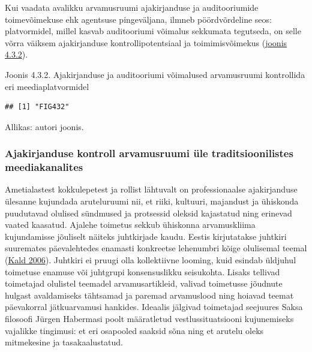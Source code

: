 \documentclass[estonian,]{article}
\begin{document}
Kui vaadata avalikku arvamusruumi ajakirjanduse ja auditooriumide toimevõimekuse ehk agentsuse pingeväljana, ilmneb pöördvõrdeline seos: platvormidel, millel kasvab auditooriumi võimalus sekkumata tegutseda, on selle võrra väiksem ajakirjanduse kontrollipotentsiaal ja toimimisvõimekus (\protect\hyperlink{figure432}{joonis 4.3.2}).

{Joonis 4.3.2.} Ajakirjanduse ja auditooriumi võimalused arvamusruumi kontrollida eri meediaplatvormidel

\begin{verbatim}
## [1] "FIG432"
\end{verbatim}

\begin{imgsource}
{Allikas:} autori joonis.
\end{imgsource}

\hypertarget{ajakirjanduse-kontroll-arvamusruumi-uxfcle-traditsioonilistes-meediakanalites}{%
\subsubsection*{Ajakirjanduse kontroll arvamusruumi üle traditsioonilistes meediakanalites}\label{ajakirjanduse-kontroll-arvamusruumi-uxfcle-traditsioonilistes-meediakanalites}}

Ametialastest kokkulepetest ja rollist lähtuvalt on professionaalse ajakirjanduse ülesanne kujundada aruteluruumi nii, et riiki, kultuuri, majandust ja ühiskonda puudutavad olulised sündmused ja protsessid oleksid kajastatud ning erinevad vaated kaasatud.
Ajalehe toimetus sekkub ühiskonna arvamuskliima kujundamisse jõuliselt näiteks juhtkirjade kaudu. Eestis kirjutatakse juhtkiri suuremates päevalehtedes enamasti konkreetse lehenumbri kõige olulisemal teemal (\protect\hyperlink{Kald2006}{Kald 2006}). Juhtkiri ei pruugi olla kollektiivne looming, kuid esindab üldjuhul toimetuse enamuse või juhtgrupi konsensuslikku seisukohta. Lisaks tellivad toimetajad olulistel teemadel arvamusartikleid, valivad toimetusse jõudnute hulgast avaldamiseks tähtsamad ja paremad arvamuslood ning hoiavad teemat päevakorral jätkuarvamusi hankides. Ideaalis jälgivad toimetajad seejuures Saksa filosoofi Jürgen Habermasi poolt määratletud vestlussituatsiooni kujunemiseks vajalikke tingimusi: et eri osapooled saaksid sõna ning et arutelu oleks mitmekesine ja tasakaalustatud.
\end{document}
